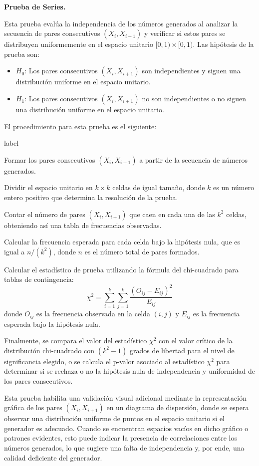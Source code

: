\documentclass{article}
\begin{document}
\textbf{Prueba de Series.}

Esta prueba evalúa la independencia de los números generados al analizar la secuencia de pares consecutivos $(X_i, X_{i+1})$ y verificar si estos pares se distribuyen uniformemente en el espacio unitario $[0, 1) \times [0, 1)$.
Las hipótesis de la prueba son:
\begin{itemize}
  \item $H_0$: Los pares consecutivos $(X_i, X_{i+1})$ son independientes y siguen una distribución uniforme en el espacio unitario.
  \item $H_1$: Los pares consecutivos $(X_i, X_{i+1})$ no son independientes o no siguen una distribución uniforme en el espacio unitario.
\end{itemize}
El procedimiento para esta prueba es el siguiente:
\begin{list}{label}{}
  \item [1.] Formar los pares consecutivos $(X_i, X_{i+1})$ a partir de la secuencia de números generados.
  \item [2.] Dividir el espacio unitario en $k \times k$ celdas de igual tamaño, donde $k$ es un número entero positivo que determina la resolución de la prueba.
  \item [3.] Contar el número de pares $(X_i, X_{i+1})$ que caen en cada una de las $k^2$ celdas, obteniendo así una tabla de frecuencias observadas.
  \item [4.] Calcular la frecuencia esperada para cada celda bajo la hipótesis nula, que es igual a $n/(k^2)$, donde $n$ es el número total de pares formados.
  \item [5.] Calcular el estadístico de prueba utilizando la fórmula del chi-cuadrado para tablas de contingencia:
        $$\chi^2 = \sum_{i=1}^{k} \sum_{j=1}^{k} \frac{(O_{ij} - E_{ij})^2}{E_{ij}}$$
        donde $O_{ij}$ es la frecuencia observada en la celda $(i, j)$ y $E_{ij}$ es la frecuencia esperada bajo la hipótesis nula.
\end{list}
Finalmente, se compara el valor del estadístico $\chi^2$ con el valor crítico de la distribución chi-cuadrado con $(k^2 - 1)$ grados de libertad para el nivel de significancia elegido, o se calcula el p-valor asociado al estadístico $\chi^2$ para determinar si se rechaza o no la hipótesis nula de independencia y uniformidad de los pares consecutivos.

Esta prueba habilita una validación visual adicional mediante la representación gráfica de los pares $(X_i, X_{i+1})$ en un diagrama de dispersión, donde se espera observar una distribución uniforme de puntos en el espacio unitario si el generador es adecuado. Cuando se encuentran espacios vacíos en dicho gráfico o patrones evidentes, esto puede indicar la presencia de correlaciones entre los números generados, lo que sugiere una falta de independencia y, por ende, una calidad deficiente del generador.
\end{document}
